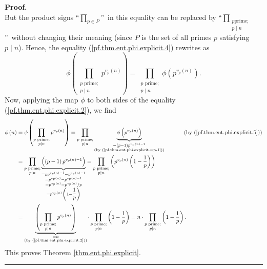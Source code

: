 \documentclass[numbers=enddot,12pt,final,onecolumn,notitlepage]{scrartcl}%
\numberwithin{exer}{subsection}
\theoremstyle{definition}
\newenvironment{proof}[1][Proof]{\noindent\textbf{#1.} }{\ \rule{0.5em}{0.5em}}
\let\prodnonlimits\prod
\renewcommand{\prod}{\prodnonlimits\limits}
\begin{document}
\begin{proof}
\begin{equation}
\end{equation}
But the product signs \textquotedblleft$\prod_{p\in P}$\textquotedblright\ in
this equality can be replaced by \textquotedblleft$\prod_{\substack{p\text{
prime;}\\p\mid n}}$\textquotedblright\ without changing their meaning (since
$P$ is the set of all primes $p$ satisfying $p\mid n$). Hence, the equality
(\ref{pf.thm.ent.phi.explicit.4}) rewrites as%
\begin{equation}
\phi\left(  \prod_{\substack{p\text{ prime;}\\p\mid n}}p^{v_{p}\left(
n\right)  }\right)  =\prod_{\substack{p\text{ prime;}\\p\mid n}}\phi\left(
p^{v_{p}\left(  n\right)  }\right)  . \label{pf.thm.ent.phi.explicit.5}%
\end{equation}
Now, applying the map $\phi$ to both sides of the equality
(\ref{pf.thm.ent.phi.explicit.2}), we find%
\begin{align*}
\phi\left(  n\right)   &  =\phi\left(  \prod_{\substack{p\text{ prime;}\\p\mid
n}}p^{v_{p}\left(  n\right)  }\right)  =\prod_{\substack{p\text{
prime;}\\p\mid n}}\underbrace{\phi\left(  p^{v_{p}\left(  n\right)  }\right)
}_{\substack{=\left(  p-1\right)  p^{v_{p}\left(  n\right)  -1}\\\text{(by
(\ref{pf.thm.ent.phi.explicit.=p-1}))}}}\ \ \ \ \ \ \ \ \ \ \left(  \text{by
(\ref{pf.thm.ent.phi.explicit.5})}\right) \\
&  =\prod_{\substack{p\text{ prime;}\\p\mid n}}\underbrace{\left(  \left(
p-1\right)  p^{v_{p}\left(  n\right)  -1}\right)  }_{\substack{=pp^{v_{p}%
\left(  n\right)  -1}-p^{v_{p}\left(  n\right)  -1}\\=p^{v_{p}\left(
n\right)  }-p^{v_{p}\left(  n\right)  -1}\\=p^{v_{p}\left(  n\right)
}-p^{v_{p}\left(  n\right)  }/p\\=p^{v_{p}\left(  n\right)  }\left(
1-\dfrac{1}{p}\right)  }}=\prod_{\substack{p\text{ prime;}\\p\mid n}}\left(
p^{v_{p}\left(  n\right)  }\left(  1-\dfrac{1}{p}\right)  \right) \\
&  =\underbrace{\left(  \prod_{\substack{p\text{ prime;}\\p\mid n}%
}p^{v_{p}\left(  n\right)  }\right)  }_{\substack{=n\\\text{(by
(\ref{pf.thm.ent.phi.explicit.2}))}}}\cdot\prod_{\substack{p\text{
prime;}\\p\mid n}}\left(  1-\dfrac{1}{p}\right)  =n\cdot\prod
_{\substack{p\text{ prime;}\\p\mid n}}\left(  1-\dfrac{1}{p}\right)  .
\end{align*}
This proves Theorem \ref{thm.ent.phi.explicit}.
\end{proof}
\end{document}

